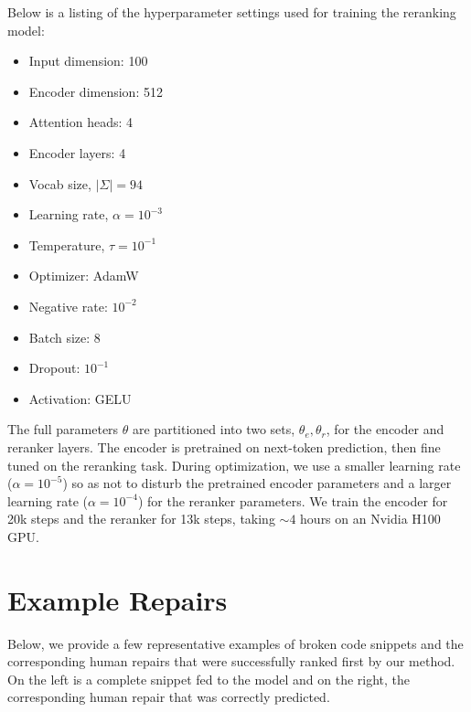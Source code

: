 \documentclass[sigplan,review,acmsmall,nonacm,screen,anonymous]{acmart}\settopmatter{printfolios=false,printccs=false,printacmref=false}
\begin{document}
Below is a listing of the hyperparameter settings used for training the reranking model:

\begin{multicols}{3}
\begin{itemize}
\item Input dimension: 100
\item Encoder dimension: 512
\item Attention heads: 4
\item Encoder layers: 4
\item Vocab size, $|\Sigma|= 94$
\item Learning rate, $\alpha= 10^{-3}$
\item Temperature, $\tau= 10^{-1}$
\item Optimizer: AdamW
\item Negative rate: $10^{-2}$
\item Batch size: 8
\item Dropout: $10^{-1}$
\item Activation: GELU
\end{itemize}
\end{multicols}

The full parameters $\theta$ are partitioned into two sets, $\theta_e, \theta_r$, for the encoder and reranker layers. The encoder is pretrained on next-token prediction, then fine tuned on the reranking task. During optimization, we use a smaller learning rate ($\alpha = 10^{-5}$) so as not to disturb the pretrained encoder parameters and a larger learning rate ($\alpha = 10^{-4}$) for the reranker parameters. We train the encoder for 20k steps and the reranker for 13k steps, taking $\sim 4$ hours on an Nvidia H100 GPU.

\clearpage\section{Example Repairs}\label{sec:exaple_repairs}

Below, we provide a few representative examples of broken code snippets and the corresponding human repairs that were successfully ranked first by our method. On the left is a complete snippet fed to the model and on the right, the corresponding human repair that was correctly predicted.
\end{document}
